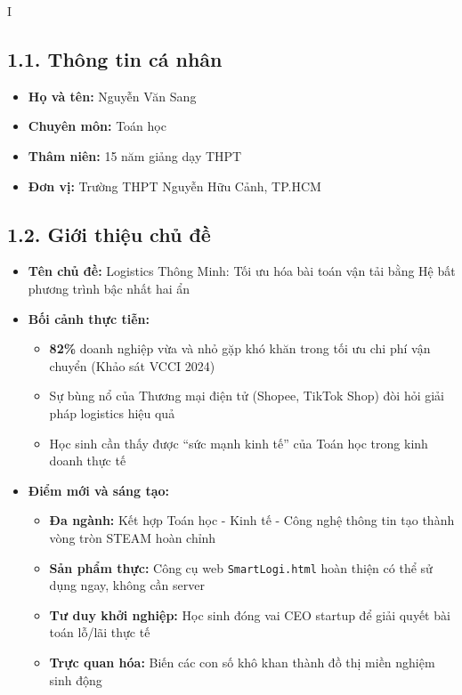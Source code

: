 \documentclass[12pt,a4paper]{article}
\begin{document}
\tableofcontents
\thispagestyle{empty}

\begin{competitionsection}{I}
\vspace{0.5cm}
\subsection*{1.1. Thông tin cá nhân}
\begin{itemize}[leftmargin=*,noitemsep]
\item \textbf{Họ và tên:} Nguyễn Văn Sang
\item \textbf{Chuyên môn:} Toán học
\item \textbf{Thâm niên:} 15 năm giảng dạy THPT
\item \textbf{Đơn vị:} Trường THPT Nguyễn Hữu Cảnh, TP.HCM
\end{itemize}

\subsection*{1.2. Giới thiệu chủ đề}
\begin{itemize}[leftmargin=*,noitemsep]
\item \textbf{Tên chủ đề:} \textcolor{accent}{Logistics Thông Minh: Tối ưu hóa bài toán vận tải bằng Hệ bất phương trình bậc nhất hai ẩn}
\item \textbf{Bối cảnh thực tiễn:}
    \begin{itemize}
    \item \textbf{82\%} doanh nghiệp vừa và nhỏ gặp khó khăn trong tối ưu chi phí vận chuyển (Khảo sát VCCI 2024)
    \item Sự bùng nổ của Thương mại điện tử (Shopee, TikTok Shop) đòi hỏi giải pháp logistics hiệu quả
    \item Học sinh cần thấy được ``sức mạnh kinh tế'' của Toán học trong kinh doanh thực tế
    \end{itemize}
\item \textbf{Điểm mới và sáng tạo:}
    \begin{itemize}
    \item \textbf{Đa ngành:} Kết hợp Toán học - Kinh tế - Công nghệ thông tin tạo thành vòng tròn STEAM hoàn chỉnh
    \item \textbf{Sản phẩm thực:} Công cụ web \texttt{SmartLogi.html} hoàn thiện có thể sử dụng ngay, không cần server
    \item \textbf{Tư duy khởi nghiệp:} Học sinh đóng vai CEO startup để giải quyết bài toán lỗ/lãi thực tế
    \item \textbf{Trực quan hóa:} Biến các con số khô khan thành đồ thị miền nghiệm sinh động
    \end{itemize}
\end{itemize}


\end{competitionsection}
\end{document}
